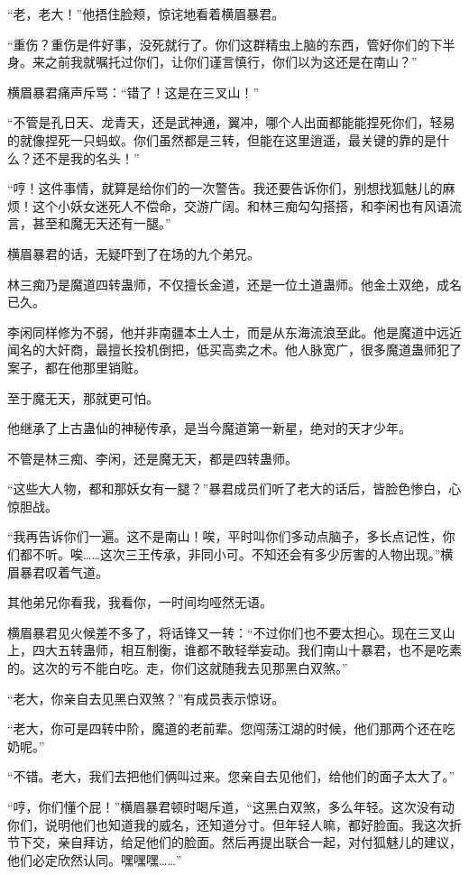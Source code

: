 \begin{this_body}
“老，老大！”他捂住脸颊，惊诧地看着横眉暴君。

“重伤？重伤是件好事，没死就行了。你们这群精虫上脑的东西，管好你们的下半身。来之前我就嘱托过你们，让你们谨言慎行，你们以为这还是在南山？”

横眉暴君痛声斥骂：“错了！这是在三叉山！”

“不管是孔日天、龙青天，还是武神通，翼冲，哪个人出面都能能捏死你们，轻易的就像捏死一只蚂蚁。你们虽然都是三转，但能在这里逍遥，最关键的靠的是什么？还不是我的名头！”

“哼！这件事情，就算是给你们的一次警告。我还要告诉你们，别想找狐魅儿的麻烦！这个小妖女迷死人不偿命，交游广阔。和林三痴勾勾搭搭，和李闲也有风语流言，甚至和魔无天还有一腿。”

横眉暴君的话，无疑吓到了在场的九个弟兄。

林三痴乃是魔道四转蛊师，不仅擅长金道，还是一位土道蛊师。他金土双绝，成名已久。

李闲同样修为不弱，他并非南疆本土人士，而是从东海流浪至此。他是魔道中远近闻名的大奸商，最擅长投机倒把，低买高卖之术。他人脉宽广，很多魔道蛊师犯了案子，都在他那里销赃。

至于魔无天，那就更可怕。

他继承了上古蛊仙的神秘传承，是当今魔道第一新星，绝对的天才少年。

不管是林三痴、李闲，还是魔无天，都是四转蛊师。

“这些大人物，都和那妖女有一腿？”暴君成员们听了老大的话后，皆脸色惨白，心惊胆战。

“我再告诉你们一遍。这不是南山！唉，平时叫你们多动点脑子，多长点记性，你们都不听。唉……这次三王传承，非同小可。不知还会有多少厉害的人物出现。”横眉暴君叹着气道。

其他弟兄你看我，我看你，一时间均哑然无语。

横眉暴君见火候差不多了，将话锋又一转：“不过你们也不要太担心。现在三叉山上，四大五转蛊师，相互制衡，谁都不敢轻举妄动。我们南山十暴君，也不是吃素的。这次的亏不能白吃。走，你们这就随我去见那黑白双煞。”

“老大，你亲自去见黑白双煞？”有成员表示惊讶。

“老大，你可是四转中阶，魔道的老前辈。您闯荡江湖的时候，他们那两个还在吃奶呢。”

“不错。老大，我们去把他们俩叫过来。您亲自去见他们，给他们的面子太大了。”

“哼，你们懂个屁！”横眉暴君顿时喝斥道，“这黑白双煞，多么年轻。这次没有动你们，说明他们也知道我的威名，还知道分寸。但年轻人嘛，都好脸面。我这次折节下交，亲自拜访，给足他们的脸面。然后再提出联合一起，对付狐魅儿的建议，他们必定欣然认同。嘿嘿嘿……”


\end{this_body}
